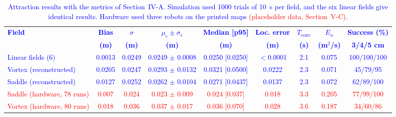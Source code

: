 \documentclass[lettersize,journal]{IEEEtran}
\newcommand{\syn}[1]{\textcolor{red}{#1}}            %
\newcommand{\rev}[1]{\textcolor{blue}{#1}}           %
\begin{document}
\begin{table}[!t]
\centering
\footnotesize
\caption{Attraction results with the metrics of Section~IV-A. Simulation used 1000 trials of 10~s per field, and the six linear fields give identical results. Hardware used three robots on the printed maps \syn{(placeholder data, Section~V-C)}.}
\label{tab:simulation_estimation_results}
\setlength{\tabcolsep}{4pt}
\rev{\begin{tabular}{lcccccccc}
\hline
\textbf{Field} & \textbf{Bias} & \textbf{$\sigma$} & \textbf{$\mu_e \pm \sigma_e$} & \textbf{Median [p95]} & \textbf{Loc. error} & \textbf{$T_{\mathrm{conv}}$} & \textbf{$E_u$} & \textbf{Success (\%)} \\
 & \textbf{(m)} & \textbf{(m)} & \textbf{(m)} & \textbf{(m)} & \textbf{(m)} & \textbf{(s)} & \textbf{(m$^2$/s)} & \textbf{3/4/5 cm} \\
\hline
Linear fields (6) & 0.0013 & 0.0249 & 0.0249 $\pm$ 0.0008 & 0.0250 [0.0250] & $<$0.0001 & 2.1 & 0.075 & 100/100/100 \\
Vortex (reconstructed) & 0.0205 & 0.0247 & 0.0293 $\pm$ 0.0132 & 0.0321 [0.0500] & 0.0222 & 2.3 & 0.071 & 45/79/95 \\
Saddle (reconstructed) & 0.0127 & 0.0252 & 0.0262 $\pm$ 0.0104 & 0.0271 [0.0437] & 0.0137 & 2.3 & 0.072 & 62/89/100 \\
\hline
\syn{Saddle (hardware, 78 runs)} & \syn{0.007} & \syn{0.024} & \syn{0.023 $\pm$ 0.009} & \syn{0.024 [0.037]} & \syn{0.018} & \syn{3.3} & \syn{0.205} & \syn{77/99/100} \\
\syn{Vortex (hardware, 80 runs)} & \syn{0.018} & \syn{0.036} & \syn{0.037 $\pm$ 0.017} & \syn{0.036 [0.070]} & \syn{0.028} & \syn{3.6} & \syn{0.187} & \syn{34/60/86} \\
\hline
\end{tabular}} %
\end{table}
\end{document}
